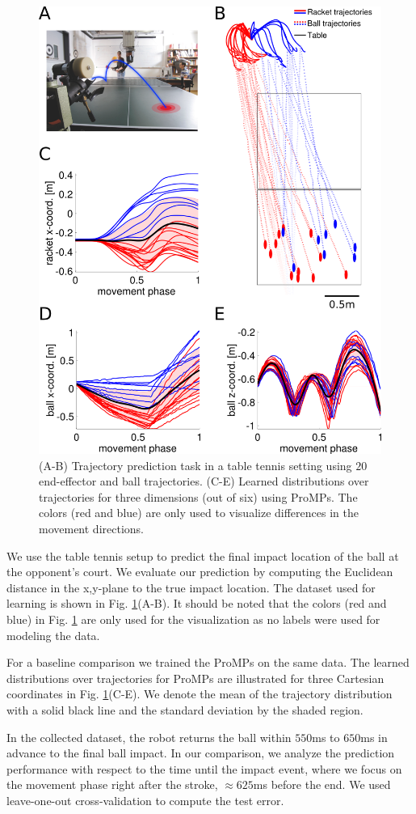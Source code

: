 \begin{figure}
\begin{center}
\includegraphics[width=0.48\columnwidth]{elmarICRA/pics/PingPong_Data.png}
\end{center}
\caption{(A-B) Trajectory prediction task in a table tennis setting using $20$ end-effector and ball trajectories. 
(C-E) Learned distributions over trajectories for three dimensions (out of six) using ProMPs. 
The colors (red and blue) are only used to visualize differences in the movement directions.
\label{fig:pingpong_data_promps}
}
\vspace{-0.5em}
\end{figure}

We use the table tennis setup to predict the final impact location
of the ball at the opponent's court. We evaluate our prediction by computing the
Euclidean distance in the x,y-plane to the true impact location. The dataset
used for learning is shown in Fig. \ref{fig:pingpong_data_promps}(A-B).  It
should be noted that the colors (red and blue) in Fig.
\ref{fig:pingpong_data_promps} are only used for the visualization as no labels
were used for modeling the data. 

For a baseline comparison we trained the ProMPs on the same data. 
The learned distributions over trajectories for ProMPs are illustrated for three Cartesian coordinates in Fig.
\ref{fig:pingpong_data_promps}(C-E). We denote the mean of the trajectory
distribution with a solid black line and the standard deviation by the shaded
region. 

In the collected dataset, the robot returns the ball within $550$ms to $650$ms in
advance to the final ball impact.  In our comparison, we analyze the prediction
performance with respect to the time until the impact event, where we focus on
the movement phase right after the stroke, $\approx 625$ms before the end. We
used leave-one-out cross-validation to compute the test error.



